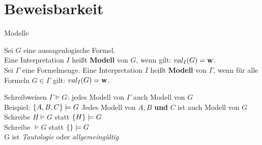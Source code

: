 

\newcommand{\inferrule}[2]{\displaystyle\frac{\quad #1 \quad}{\quad #2 \quad}}
\newcommand{\rulename}[1]{{~\textsf{\scriptsize(#1)}}}
\newcommand{\schlussregeln}{
	\centering
	\begin{displaymath}
		\begin{array}
			{c@{\hspace{2cm}}c} \displaystyle
			\inferrule{A \quad B}{A \aland B} \rulename{$\aland$I}
			 & \inferrule{A \aland B}{A}\rulename{$\aland$E$_l$} \quad
			\inferrule{A \aland B}{B} \rulename{$\aland$E$_r$}                                \\[2ex]
			\inferrule{A}{A \alor B}\rulename{$\alor$I$_l$} \quad
			\inferrule{B}{A \alor B}\rulename{$\alor$I$_r$}
			 & \inferrule{A \alor B\quad A \alimpl C \quad B \alimpl C}{C}\rulename{$\alor$E} \\[2ex]
			\inferrule{A \alvdash B}{A \alimpl B}\rulename{$\alimpl$I}
			 & \inferrule{A \quad A \alimpl B}{B}\rulename{MP}\rulename{$\alimpl$E}           \\[2ex]
			\inferrule{A \alimpl \alfalse}{\alnot A}\rulename{$\alnot$I}
			 & \inferrule{A \quad \alnot A}{\alfalse}\rulename{$\alnot$E} \quad
			\inferrule{\alnot \alnot A}{A}\rulename{$\alnot\alnot$E}
			\\[2ex]
			\inferrule{\alnot A \alimpl \alfalse}{A}\rulename{RAA}
			 & \inferrule{}{A \alvdash A}\rulename{Ax}
		\end{array}
	\end{displaymath}
}

\section{Beweisbarkeit}

\begin{frame}{Modelle}
	\begin{Definition}
		Sei $G$ eine aussagenlogische Formel. \\
		Eine Interpretation $I$ heißt \textbf{Modell} von $G$, wenn gilt: \quad $val_I(G) = \hbox{\textbf{w}}$. \\
		\pause
		\medskip
		Sei $\Gamma$ eine Formelmenge.
		Eine Interpretation $I$ heißt \textbf{Modell} von $\Gamma$, wenn für alle Formeln $G \in  \Gamma$ gilt: \quad $val_I(G) = \hbox{\textbf{w}}$.
	\end{Definition}
	\pause
	\begin{block}{Schreibweisen}
		$\Gamma \models G$: jedes Modell von $\Gamma$ auch Modell von $G$ \\
		Beispiel: \quad $\left\{A,B,C\right\} \models G$ \quad Jedes Modell von $A, B$ \textbf{und} $C$ ist auch Modell von $G$ \\
		\medskip
		Schreibe $H \models G$ statt $\left\{H\right\} \models G$ \\
		\medskip
		Schreibe $\models G$ statt $\left\{\right\} \models G$ \\
		\impl G ist \emph{Tautologie} oder \emph{allgemeingültig}
	\end{block}
\end{frame}

